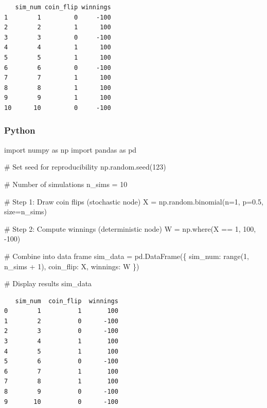 \documentclass[
  letterpaper,
  DIV=11,
  numbers=noendperiod]{scrartcl}
\newenvironment{Shaded}{\begin{snugshade}}{\end{snugshade}}
\newcommand{\BuiltInTok}[1]{\textcolor[rgb]{0.00,0.23,0.31}{#1}}
\newcommand{\CommentTok}[1]{\textcolor[rgb]{0.37,0.37,0.37}{#1}}
\newcommand{\DecValTok}[1]{\textcolor[rgb]{0.68,0.00,0.00}{#1}}
\newcommand{\FloatTok}[1]{\textcolor[rgb]{0.68,0.00,0.00}{#1}}
\newcommand{\ImportTok}[1]{\textcolor[rgb]{0.00,0.46,0.62}{#1}}
\newcommand{\NormalTok}[1]{\textcolor[rgb]{0.00,0.23,0.31}{#1}}
\newcommand{\OperatorTok}[1]{\textcolor[rgb]{0.37,0.37,0.37}{#1}}
\newcommand{\StringTok}[1]{\textcolor[rgb]{0.13,0.47,0.30}{#1}}
\theoremstyle{definition}
\theoremstyle{remark}
\begin{document}
\begin{verbatim}
   sim_num coin_flip winnings
1        1         0     -100
2        2         1      100
3        3         0     -100
4        4         1      100
5        5         1      100
6        6         0     -100
7        7         1      100
8        8         1      100
9        9         1      100
10      10         0     -100
\end{verbatim}

\subsubsection{Python}

\begin{Shaded}
\begin{Highlighting}[]
\ImportTok{import}\NormalTok{ numpy }\ImportTok{as}\NormalTok{ np}
\ImportTok{import}\NormalTok{ pandas }\ImportTok{as}\NormalTok{ pd}

\CommentTok{\# Set seed for reproducibility}
\NormalTok{np.random.seed(}\DecValTok{123}\NormalTok{)}

\CommentTok{\# Number of simulations}
\NormalTok{n\_sims }\OperatorTok{=} \DecValTok{10}

\CommentTok{\# Step 1: Draw coin flips (stochastic node)}
\NormalTok{X }\OperatorTok{=}\NormalTok{ np.random.binomial(n}\OperatorTok{=}\DecValTok{1}\NormalTok{, p}\OperatorTok{=}\FloatTok{0.5}\NormalTok{, size}\OperatorTok{=}\NormalTok{n\_sims)}

\CommentTok{\# Step 2: Compute winnings (deterministic node)}
\NormalTok{W }\OperatorTok{=}\NormalTok{ np.where(X }\OperatorTok{==} \DecValTok{1}\NormalTok{, }\DecValTok{100}\NormalTok{, }\OperatorTok{{-}}\DecValTok{100}\NormalTok{)}

\CommentTok{\# Combine into data frame}
\NormalTok{sim\_data }\OperatorTok{=}\NormalTok{ pd.DataFrame(\{}
    \StringTok{\textquotesingle{}sim\_num\textquotesingle{}}\NormalTok{: }\BuiltInTok{range}\NormalTok{(}\DecValTok{1}\NormalTok{, n\_sims }\OperatorTok{+} \DecValTok{1}\NormalTok{),}
    \StringTok{\textquotesingle{}coin\_flip\textquotesingle{}}\NormalTok{: X,}
    \StringTok{\textquotesingle{}winnings\textquotesingle{}}\NormalTok{: W}
\NormalTok{\})}

\CommentTok{\# Display results}
\NormalTok{sim\_data}
\end{Highlighting}
\end{Shaded}

\begin{verbatim}
   sim_num  coin_flip  winnings
0        1          1       100
1        2          0      -100
2        3          0      -100
3        4          1       100
4        5          1       100
5        6          0      -100
6        7          1       100
7        8          1       100
8        9          0      -100
9       10          0      -100
\end{verbatim}
\end{document}
